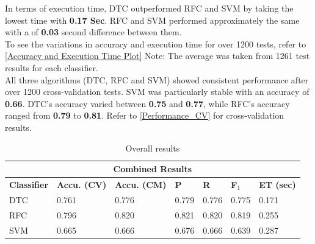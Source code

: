 \documentclass[conference]{IEEEtran}
\begin{document}
	In terms of execution time, DTC outperformed RFC and SVM by taking the lowest time with \textbf{0.17 Sec}. RFC and SVM performed approximately the same with a of \textbf{0.03 }second difference between them.\\ To see the variations in accuracy and execution time for over 1200 tests, refer to \figurename{\ref{Accuracy and Execution Time Plot}}
	Note: The average was taken from 1261 test results for each classifier.\\
	All three algorithms (DTC, RFC and SVM) showed consistent performance after over 1200 cross-validation tests. SVM was particularly stable with an accuracy of \textbf{0.66}. DTC's accuracy varied between \textbf{0.75} and \textbf{0.77}, while RFC's accuracy ranged from \textbf{0.79} to \textbf{0.81}. Refer to \figurename{\ref{Performance_CV}} for cross-validation results.\\
	\begin{table}[H]	
		\begin{center}
			\begin{tabular}[H]{ |p{1.5cm}|p{0.8cm}|p{0.8cm}|p{0.7cm}|p{0.7cm}|p{0.7cm}|p{0.7cm}|}
				\hline
				\multicolumn{7}{|c|}{\textbf{Combined Results}} \\
				\hline
				\textbf{Classifier}&\textbf{Accu. (CV)} &\textbf{Accu. (CM)} &\textbf{P} &\textbf{R}  &\textbf{F}$_{1}$ &\textbf{ET (sec)}  \\ \hline
															DTC 	&0.761 &0.776 &0.779 &0.776 &0.775 &0.171  \\ \hline
				\rowcolor{pastleyellow} RFC 		&0.796 &0.820 &0.821 &0.820 &0.819 &0.255  \\ \hline
															SVM 	&0.665 &0.666 &0.676 &0.666 &0.639 &0.287   \\ 
				\hline
			\end{tabular}
		\end{center}
		\caption{Overall results}
		\label{Overall Results}
	\end{table}
\end{document}
